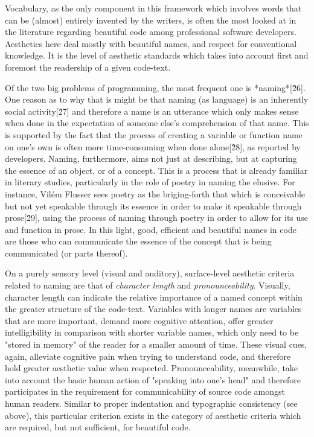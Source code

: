 Vocabulary, as the only component in this framework which involves words that can be (almost) entirely invented by the writers, is often the most looked at in the literature regarding beautiful code among professional software developers. Aesthetics here deal mostly with beautiful names, and respect for conventional knowledge. It is the level of aesthetic standards which takes into account first and foremost the readership of a given code-text.

Of the two big problems of programming, the most frequent one is *naming*[\^26]. One reason as to why that is might be that naming (as language) is an inherently social activity[\^27] and therefore a name is an utterance which only makes sense when done in the expectation of someone else's comprehension of that name. This is supported by the fact that the process of creating a variable or function name on one's own is often more time-consuming when done alone[\^28], as reported by developers. Naming, furthermore, aims not just at describing, but at capturing the essence of an object, or of a concept. This is a process that is already familiar in literary studies, particularly in the role of poetry in naming the elusive. For instance, Vilém Flusser sees poetry as the briging-forth that which is conceivable but not yet speakable through its essence in order to make it speakable through prose[\^29], using the process of naming through poetry in order to allow for its use and function in prose. In this light, good, efficient and beautiful names in code are those who can communicate the essence of the concept that is being communicated (or parts thereof).

On a purely sensory level (visual and auditory), surface-level aesthetic criteria related to naming are that of \emph{character length} and \emph{pronounceability}. Visually, character length can indicate the relative importance of a named concept within the greater structure of the code-text. Variables with longer names are variables that are more important, demand more cognitive attention, offer greater intelligibility in comparison with shorter variable names, which only need to be "stored in memory" of the reader for a smaller amount of time. These visual cues, again, alleviate cognitive pain when trying to understand code, and therefore hold greater aesthetic value when respected. Pronounceability, meanwhile, take into account the basic human action of "speaking into one's head" and therefore participates in the requirement for communicability of source code amongst human readers. Similar to proper indentation and typographic consistency (see above), this particular criterion exists in the category of aesthetic criteria which are required, but not sufficient, for beautiful code.

